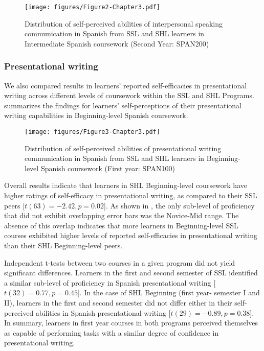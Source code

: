\documentclass[output=paper]{langscibook}
\begin{document}
\begin{figure}
\texttt{[image: figures/Figure2-Chapter3.pdf]}
\caption{Distribution of self-perceived abilities of interpersonal speaking communication in Spanish from SSL and SHL learners in Intermediate Spanish coursework (Second Year: SPAN200)}
\label{fig:3:2}
\end{figure}


\subsubsection{Presentational writing} We also compared results in learners’ reported self-efficacies in presentational writing across different levels of coursework within the SSL and SHL Programs.  summarizes the findings for learners’ self-perceptions of their presentational writing capabilities in Beginning-level Spanish coursework.

\begin{figure}
\caption{Distribution of self-perceived abilities of presentational writing communication in Spanish from SSL and SHL learners in Beginning-level Spanish coursework (First year: SPAN100)}
\label{fig:3:3}
\texttt{[image: figures/Figure3-Chapter3.pdf]}
\end{figure}




Overall results indicate that learners in SHL Beginning-level coursework have higher ratings of self-efficacy in presentational writing, as compared to their SSL peers [$t(63) = -2.42, p = 0.02$]. As shown in , the only sub-level of proficiency that did not exhibit overlapping error bars was the Novice-Mid range. The absence of this overlap indicates that more learners in Beginning-level SSL courses exhibited higher levels of reported self-efficacies in presentational writing than their SHL Beginning-level peers.

Independent t-tests between two courses in a given program did not yield significant differences. Learners in the first and second semester of SSL identified a similar sub-level of proficiency in Spanish presentational writing [$t(32) = 0.77, p = 0.45$]. In the case of SHL Beginning (first year- semester I and II), learners in the first and second semester did not differ either in their self-perceived abilities in Spanish presentational writing [$t(29) = -0.89, p= 0.38$]. In summary, learners in first year courses in both programs perceived themselves as capable of performing tasks with a similar degree of confidence in presentational writing.
\end{document}
